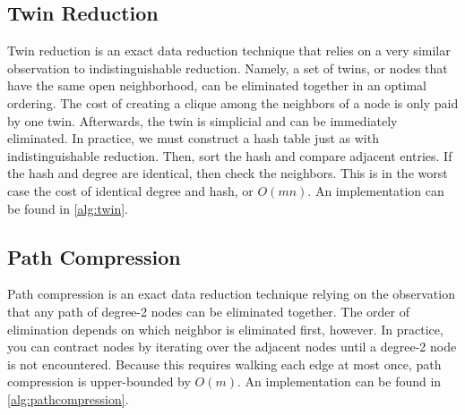 \documentclass[final]{siamart250211}
\begin{document}
\subsection{Twin Reduction}
Twin reduction is an exact data reduction technique that relies on a very similar observation to indistinguishable reduction. Namely, a set of twins, or nodes that have the same open neighborhood, can be eliminated together in an optimal ordering. The cost of creating a clique among the neighbors of a node is only paid by one twin. Afterwards, the twin is simplicial and can be immediately eliminated. In practice, we must construct a hash table just as with indistinguishable reduction. Then, sort the hash and compare adjacent entries. If the hash and degree are identical, then check the neighbors. This is in the worst case the cost of identical degree and hash, or $O(mn)$. An implementation can be found in \cref{alg:twin}.


\begin{algorithm}
\caption{Twin Reduction}
\label{alg:twin}
\begin{algorithmic}
\ENDFOR
{}
    \ENDIF
\ENDIF
\ENDFOR
\end{algorithmic}
\end{algorithm}

\subsection{Path Compression}
Path compression is an exact data reduction technique relying on the observation that any path of degree-2 nodes can be eliminated together. The order of elimination depends on which neighbor is eliminated first, however. In practice, you can contract nodes by iterating over the adjacent nodes until a degree-2 node is not encountered. Because this requires walking each edge at most once, path compression is upper-bounded by $O(m)$. An implementation can be found in \cref{alg:pathcompression}.

\begin{algorithm}
\caption{Path Compression}
\label{alg:pathcompression}
\begin{algorithmic}
            \ENDIF
        \ENDWHILE

        \ENDIF
    \ENDIF
\ENDFOR
\end{algorithmic}
\end{algorithm}
\end{document}
